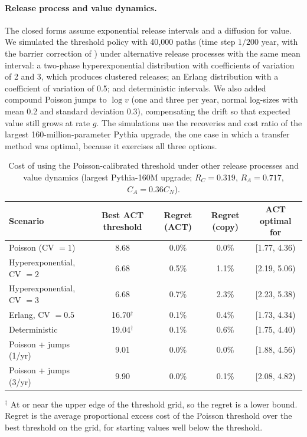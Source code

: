 \documentclass[ijds,nonblindrev]{informs4}
\begin{document}
\paragraph{Release process and value dynamics.} The closed forms assume exponential release intervals and a diffusion for value. We simulated the threshold policy with 40{,}000 paths (time step $1/200$ year, with the barrier correction of \citealt{broadie1997continuity}) under alternative release processes with the same mean interval: a two-phase hyperexponential distribution with coefficients of variation of 2 and 3, which produces clustered releases; an Erlang distribution with a coefficient of variation of 0.5; and deterministic intervals. We also added compound Poisson jumps to $\log v$ (one and three per year, normal log-sizes with mean 0.2 and standard deviation 0.3), compensating the drift so that expected value still grows at rate $g$. The simulations use the recoveries and cost ratio of the largest 160-million-parameter Pythia upgrade, the one case in which a transfer method was optimal, because it exercises all three options.

\begin{table}[t]
\centering
\caption{Cost of using the Poisson-calibrated threshold under other release processes and value dynamics (largest Pythia-160M upgrade; $R_C=0.319$, $R_A=0.717$, $C_A=0.36C_N$).}\label{tab:robust}
\small
\begin{tabular}{lcccc}
\toprule
Scenario & Best ACT threshold & Regret (ACT) & Regret (copy) & ACT optimal for\\
\midrule
Poisson (CV $=1$) & 8.68 & 0.0\% & 0.0\% & [1.77, 4.36)\\
Hyperexponential, CV $=2$ & 6.68 & 0.5\% & 1.1\% & [2.19, 5.06)\\
Hyperexponential, CV $=3$ & 6.68 & 0.7\% & 2.3\% & [2.23, 5.38)\\
Erlang, CV $=0.5$ & 16.70$^\dagger$ & 0.1\% & 0.4\% & [1.73, 4.34)\\
Deterministic & 19.04$^\dagger$ & 0.1\% & 0.6\% & [1.75, 4.40)\\
Poisson + jumps (1/yr) & 9.01 & 0.0\% & 0.0\% & [1.88, 4.56)\\
Poisson + jumps (3/yr) & 9.90 & 0.0\% & 0.1\% & [2.08, 4.82)\\
\bottomrule
\end{tabular}

\smallskip\footnotesize $^\dagger$ At or near the upper edge of the threshold grid, so the regret is a lower bound. Regret is the average proportional excess cost of the Poisson threshold over the best threshold on the grid, for starting values well below the threshold.
\end{table}
\end{document}
